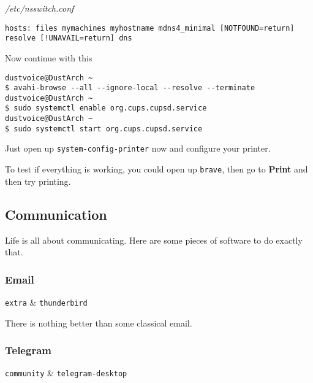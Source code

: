 \documentclass[10pt]{dustdoc}
\begin{document}
\begin{mintedlisting}
    \caption*{\textit{/etc/nsswitch.conf}}
    \begin{verbatim}
hosts: files mymachines myhostname mdns4_minimal [NOTFOUND=return] resolve [!UNAVAIL=return] dns
    \end{verbatim}
\end{mintedlisting}

Now continue with this

\begin{verbatim}
dustvoice@DustArch ~
$ avahi-browse --all --ignore-local --resolve --terminate
dustvoice@DustArch ~
$ sudo systemctl enable org.cups.cupsd.service
dustvoice@DustArch ~
$ sudo systemctl start org.cups.cupsd.service
\end{verbatim}

Just open up \texttt{system-config-printer} now and configure your printer.

To test if everything is working, you could open up \texttt{brave}, then go to \textbf{Print} and then try printing.

\subsection{Communication}
\label{sec:gui-communication}

Life is all about communicating.
Here are some pieces of software to do exactly that.

\subsubsection{Email}
\label{sec:email}

\begin{packagetable}
    \texttt{extra} & \texttt{thunderbird} \\ 
\end{packagetable}

There is nothing better than some classical email.

\subsubsection{Telegram}
\label{sec:telegram}

\begin{packagetable}
    \texttt{community} & \texttt{telegram-desktop} \\ 
\end{packagetable}
\end{document}
